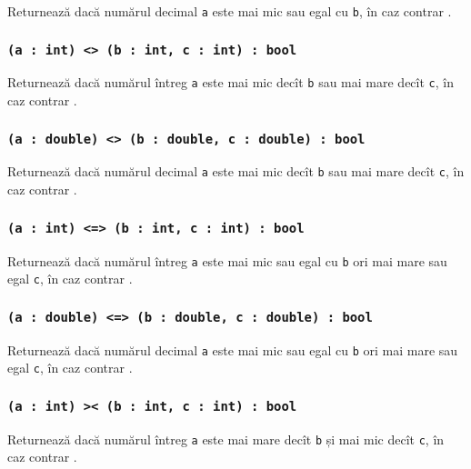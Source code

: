 Returnează \true{} dacă numărul decimal \texttt{a} este mai mic sau egal cu \texttt{b}, în caz contrar \false{}.

\subsubsection{\texttt{(a : int) <> (b : int, c : int) : bool}}

Returnează \true{} dacă numărul întreg \texttt{a} este mai mic decît \texttt{b} sau mai mare decît \texttt{c}, în caz contrar \false{}.

\subsubsection{\texttt{(a : double) <> (b : double, c : double) : bool}}

Returnează \true{} dacă numărul decimal \texttt{a} este mai mic decît \texttt{b} sau mai mare decît \texttt{c}, în caz contrar \false{}.

\subsubsection{\texttt{(a : int) <=> (b : int, c : int) : bool}}

Returnează \true{} dacă numărul întreg \texttt{a} este mai mic sau egal cu \texttt{b} ori mai mare sau egal \texttt{c}, în caz contrar \false{}.

\subsubsection{\texttt{(a : double) <=> (b : double, c : double) : bool}}

Returnează \true{} dacă numărul decimal \texttt{a} este mai mic sau egal cu \texttt{b} ori mai mare sau egal \texttt{c}, în caz contrar \false{}.

\subsubsection{\texttt{(a : int) >< (b : int, c : int) : bool}}

Returnează \true{} dacă numărul întreg \texttt{a} este mai mare decît \texttt{b} și mai mic decît \texttt{c}, în caz contrar \false{}.

